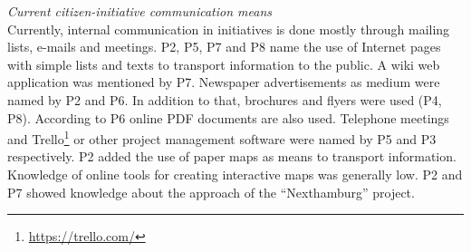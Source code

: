 \textit{Current citizen-initiative communication means}\\
Currently, internal communication in initiatives is done mostly through mailing lists, e-mails and meetings. P2, P5, P7 and P8 name the use of Internet pages with simple lists and texts to transport information to the public. A wiki web application was mentioned by P7. Newspaper advertisements as medium were named by P2 and P6. In addition to that, brochures and flyers were used (P4, P8). According to P6 online PDF documents are also used. Telephone meetings and Trello\footnote{\url{https://trello.com/}} or other project management software were named by P5 and P3 respectively. P2 added the use of paper maps as means to transport information. Knowledge of online tools for creating interactive maps was generally low. P2 and P7 showed knowledge about the approach of the ``Nexthamburg'' project.

